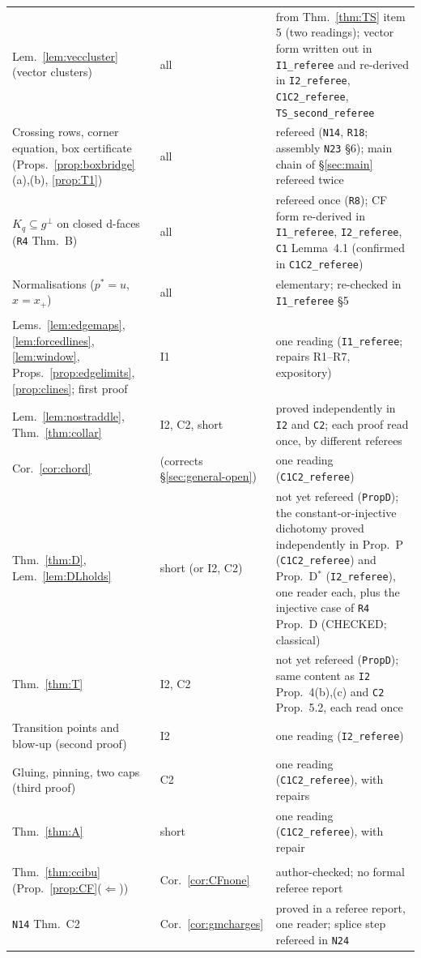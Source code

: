 \documentclass[11pt]{article}
\theoremstyle{definition}
\theoremstyle{remark}
\newcommand{\src}[1]{\texttt{#1}}
\begin{document}
{\begin{longtable}{>{\raggedright\arraybackslash}p{5.2cm}>{\raggedright\arraybackslash}p{2.2cm}>{\raggedright\arraybackslash}p{6.7cm}}
Lem.~\ref{lem:veccluster} (vector clusters) & all & from Thm.~\ref{thm:TS} item 5 (two readings); vector form written out in \src{I1\_referee} and re-derived in \src{I2\_referee}, \src{C1C2\_referee}, \src{TS\_second\_referee}\\
Crossing rows, corner equation, box certificate (Props.~\ref{prop:boxbridge}(a),(b), \ref{prop:T1}) & all & refereed (\src{N14}, \src{R18}; assembly \src{N23} \S6); main chain of \S\ref{sec:main} refereed twice\\
$K_q\subseteq g^\perp$ on closed d-faces (\src{R4} Thm.~B) & all & refereed once (\src{R8}); CF form re-derived in \src{I1\_referee}, \src{I2\_referee}, \src{C1} Lemma~4.1 (confirmed in \src{C1C2\_referee})\\
Normalisations ($p^*=u$, $x=x_+$) & all & elementary; re-checked in \src{I1\_referee} \S5\\
\midrule
\multicolumn{3}{l}{\emph{New steps}}\\
Lems.~\ref{lem:edgemaps}, \ref{lem:forcedlines}, \ref{lem:window}, Props.~\ref{prop:edgelimits}, \ref{prop:clines}; first proof & I1 & one reading (\src{I1\_referee}; repairs R1--R7, expository)\\
Lem.~\ref{lem:nostraddle}, Thm.~\ref{thm:collar} & I2, C2, short & proved independently in \src{I2} and \src{C2}; each proof read once, by different referees\\
Cor.~\ref{cor:chord} & (corrects \S\ref{sec:general-open}) & one reading (\src{C1C2\_referee})\\
Thm.~\ref{thm:D}, Lem.~\ref{lem:DLholds} & short (or I2, C2) & not yet refereed (\src{PropD}); the constant-or-injective dichotomy proved independently in Prop.~P (\src{C1C2\_referee}) and Prop.~D$^*$ (\src{I2\_referee}), one reader each, plus the injective case of \src{R4} Prop.~D (CHECKED; classical)\\
Thm.~\ref{thm:T} & I2, C2 & not yet refereed (\src{PropD}); same content as \src{I2} Prop.~4(b),(c) and \src{C2} Prop.~5.2, each read once\\
Transition points and blow-up (second proof) & I2 & one reading (\src{I2\_referee})\\
Gluing, pinning, two caps (third proof) & C2 & one reading (\src{C1C2\_referee}), with repairs\\
Thm.~\ref{thm:A} & short & one reading (\src{C1C2\_referee}), with repair\\
\midrule
\multicolumn{3}{l}{\emph{Only for the corollaries}}\\
Thm.~\ref{thm:ccibu} (Prop.~\ref{prop:CF}($\Leftarrow$)) & Cor.~\ref{cor:CFnone} & author-checked; no formal referee report\\
\src{N14} Thm.~C2 & Cor.~\ref{cor:gmcharges} & proved in a referee report, one reader; splice step refereed in \src{N24}\\
\bottomrule
\end{longtable}}
\end{document}

